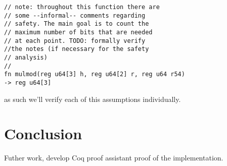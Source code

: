 \documentclass[twocolumn]{article}
\begin{document}
\begin{Verbatim}[fontsize=\footnotesize]
// note: throughout this function there are 
// some --informal-- comments regarding
// safety. The main goal is to count the 
// maximum number of bits that are needed
// at each point. TODO: formally verify 
//the notes (if necessary for the safety
// analysis)
//
fn mulmod(reg u64[3] h, reg u64[2] r, reg u64 r54) 
-> reg u64[3]
\end{Verbatim}

as such we'll verify each of this assumptions individually.


\section{Conclusion}
Futher work, develop Coq proof assistant proof of the implementation.

\printbibliography

\onecolumn
\begin{appendices}
\end{appendices}
\end{document}
